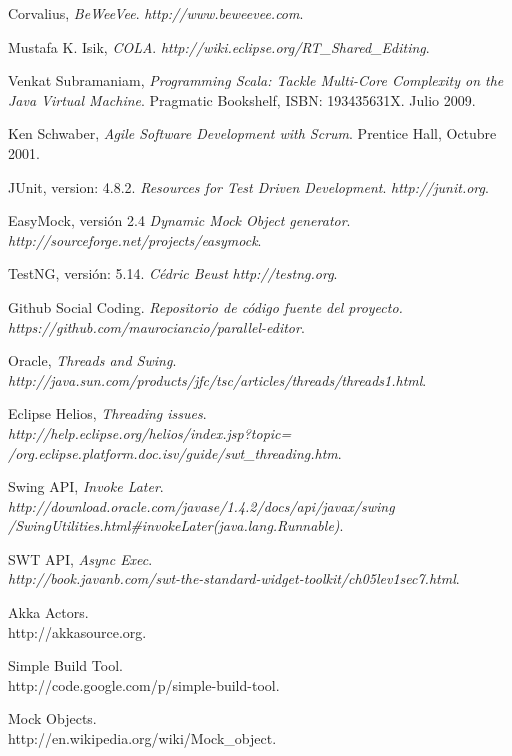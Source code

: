 \documentclass[12pt,a4paper]{article}
\begin{document}
\begin{thebibliography}{9}
	Corvalius,
	\emph{BeWeeVee}. 
	\textsl{http://www.beweevee.com}.
	
	Mustafa K. Isik,
	\emph{COLA}. 
	\textsl{ http://wiki.eclipse.org/RT\_Shared\_Editing}.

	Venkat Subramaniam,
	\emph{Programming Scala: Tackle Multi-Core Complexity on the Java Virtual Machine}.
	Pragmatic Bookshelf, ISBN: 193435631X.
	Julio 2009.

	Ken Schwaber,
	\emph{Agile Software Development with Scrum}.
	Prentice Hall, 
	Octubre 2001.

	JUnit, version: 4.8.2.
	\emph{Resources for Test Driven Development}.
	\textsl{http://junit.org}.

	EasyMock, versión 2.4
	\emph{Dynamic Mock Object generator}. \\
	\textsl{http://sourceforge.net/projects/easymock}.

	TestNG, versión: 5.14.
	\emph{Cédric Beust} 
	\textsl{http://testng.org}.

	Github Social Coding.
	\emph{Repositorio de código fuente del proyecto.} 
	\textsl{https://github.com/maurociancio/parallel-editor}.
	
	Oracle, \emph{Threads and Swing}. \\
	\textsl{http://java.sun.com/products/jfc/tsc/articles/threads/threads1.html}.

	Eclipse Helios, \emph{Threading issues}. \\
	\textsl{http://help.eclipse.org/helios/index.jsp?topic=\\
	/org.eclipse.platform.doc.isv/guide/swt\_threading.htm}.

	Swing API, \textsl{Invoke Later}. \\
	\textsl{http://download.oracle.com/javase/1.4.2/docs/api/javax/swing\\
	/SwingUtilities.html\#invokeLater(java.lang.Runnable)}.

	SWT API, \emph{Async Exec}. \\
	\textsl{http://book.javanb.com/swt-the-standard-widget-toolkit/ch05lev1sec7.html}.
	
	Akka Actors. \\
	http://akkasource.org.
	
	Simple Build Tool. \\
	http://code.google.com/p/simple-build-tool.
	
	Mock Objects. \\
	http://en.wikipedia.org/wiki/Mock\_object.

\end{thebibliography}
\end{document}
